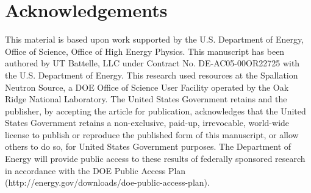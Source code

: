 \documentclass[%
 reprint,
 amsmath,amssymb,
 aps,
prstab,
]{revtex4-2}
\begin{document}
\section{Acknowledgements}
This material is based upon work supported by the U.S. Department of Energy, Office of Science, Office of High Energy Physics. This manuscript has been authored by UT Battelle, LLC under Contract No. DE-AC05-00OR22725 with the U.S. Department of Energy. This research used resources at the Spallation Neutron Source, a DOE Office of Science User Facility operated by the Oak Ridge National Laboratory. The United States Government retains and the publisher, by accepting the article for publication, acknowledges that the United States Government retains a non-exclusive, paid-up, irrevocable, world-wide license to publish or reproduce the published form of this manuscript, or allow others to do so, for United States Government purposes. The Department of Energy will provide public access to these results of federally sponsored research in accordance with the DOE Public Access Plan (http://energy.gov/downloads/doe-public-access-plan).



\end{document}
